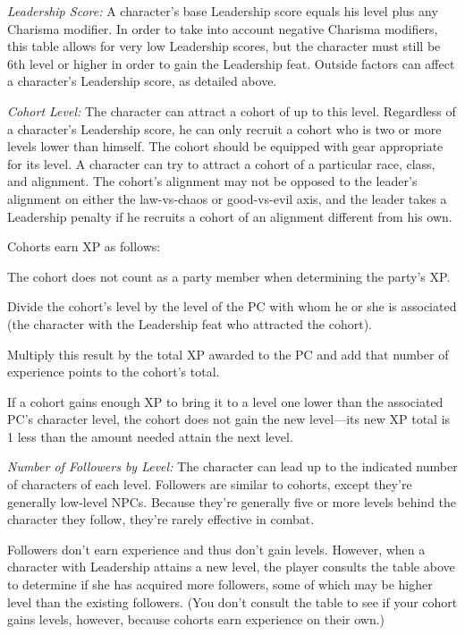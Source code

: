 {\textit{Leadership Score:} A character's base Leadership score equals his level plus any Charisma modifier. In order to take into account negative Charisma modifiers, this table allows for very low Leadership scores, but the character must still be 6th level or higher in order to gain the Leadership feat. Outside factors can affect a character's Leadership score, as detailed above.

\textit{Cohort Level:} The character can attract a cohort of up to this level. Regardless of a character's Leadership score, he can only recruit a cohort who is two or more levels lower than himself. The cohort should be equipped with gear appropriate for its level. A character can try to attract a cohort of a particular race, class, and alignment. The cohort's alignment may not be opposed to the leader's alignment on either the law-vs-chaos or good-vs-evil axis, and the leader takes a Leadership penalty if he recruits a cohort of an alignment different from his own.

Cohorts earn XP as follows:

\begin{enumerate*}
\item The cohort does not count as a party member when determining the party's XP.
\item Divide the cohort's level by the level of the PC with whom he or she is associated (the character with the Leadership feat who attracted the cohort).
\item Multiply this result by the total XP awarded to the PC and add that number of experience points to the cohort's total.
\end{enumerate*}

If a cohort gains enough XP to bring it to a level one lower than the associated PC's character level, the cohort does not gain the new level---its new XP total is 1 less than the amount needed attain the next level.

\textit{Number of Followers by Level:} The character can lead up to the indicated number of characters of each level. Followers are similar to cohorts, except they're generally low-level NPCs. Because they're generally five or more levels behind the character they follow, they're rarely effective in combat.

Followers don't earn experience and thus don't gain levels. However, when a character with Leadership attains a new level, the player consults the table above to determine if she has acquired more followers, some of which may be higher level than the existing followers. (You don't consult the table to see if your cohort gains levels, however, because cohorts earn experience on their own.)

}
